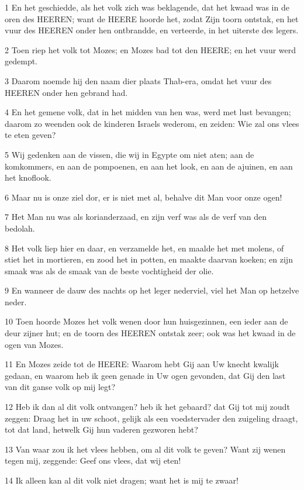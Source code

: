 \par 1 En het geschiedde, als het volk zich was beklagende, dat het kwaad was in de oren des HEEREN; want de HEERE hoorde het, zodat Zijn toorn ontstak, en het vuur des HEEREN onder hen ontbrandde, en verteerde, in het uiterste des legers.
\par 2 Toen riep het volk tot Mozes; en Mozes bad tot den HEERE; en het vuur werd gedempt.
\par 3 Daarom noemde hij den naam dier plaats Thab-era, omdat het vuur des HEEREN onder hen gebrand had.
\par 4 En het gemene volk, dat in het midden van hen was, werd met lust bevangen; daarom zo weenden ook de kinderen Israels wederom, en zeiden: Wie zal ons vlees te eten geven?
\par 5 Wij gedenken aan de vissen, die wij in Egypte om niet aten; aan de komkommers, en aan de pompoenen, en aan het look, en aan de ajuinen, en aan het knoflook.
\par 6 Maar nu is onze ziel dor, er is niet met al, behalve dit Man voor onze ogen!
\par 7 Het Man nu was als korianderzaad, en zijn verf was als de verf van den bedolah.
\par 8 Het volk liep hier en daar, en verzamelde het, en maalde het met molens, of stiet het in mortieren, en zood het in potten, en maakte daarvan koeken; en zijn smaak was als de smaak van de beste vochtigheid der olie.
\par 9 En wanneer de dauw des nachts op het leger nederviel, viel het Man op hetzelve neder.
\par 10 Toen hoorde Mozes het volk wenen door hun huisgezinnen, een ieder aan de deur zijner hut; en de toorn des HEEREN ontstak zeer; ook was het kwaad in de ogen van Mozes.
\par 11 En Mozes zeide tot de HEERE: Waarom hebt Gij aan Uw knecht kwalijk gedaan, en waarom heb ik geen genade in Uw ogen gevonden, dat Gij den last van dit ganse volk op mij legt?
\par 12 Heb ik dan al dit volk ontvangen? heb ik het gebaard? dat Gij tot mij zoudt zeggen: Draag het in uw schoot, gelijk als een voedstervader den zuigeling draagt, tot dat land, hetwelk Gij hun vaderen gezworen hebt?
\par 13 Van waar zou ik het vlees hebben, om al dit volk te geven? Want zij wenen tegen mij, zeggende: Geef ons vlees, dat wij eten!
\par 14 Ik alleen kan al dit volk niet dragen; want het is mij te zwaar!
